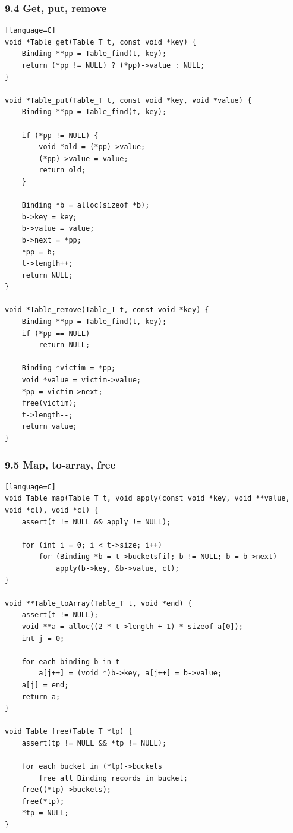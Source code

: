 \documentclass[11pt]{article}
\begin{document}
\subsubsection{9.4 Get, put, remove}\label{get-put-remove}

\begin{verbatim}[language=C]
void *Table_get(Table_T t, const void *key) {
    Binding **pp = Table_find(t, key);
    return (*pp != NULL) ? (*pp)->value : NULL;
}

void *Table_put(Table_T t, const void *key, void *value) {
    Binding **pp = Table_find(t, key);

    if (*pp != NULL) {
        void *old = (*pp)->value;
        (*pp)->value = value;
        return old;
    }

    Binding *b = alloc(sizeof *b);
    b->key = key;
    b->value = value;
    b->next = *pp;
    *pp = b;
    t->length++;
    return NULL;
}

void *Table_remove(Table_T t, const void *key) {
    Binding **pp = Table_find(t, key);
    if (*pp == NULL)
        return NULL;

    Binding *victim = *pp;
    void *value = victim->value;
    *pp = victim->next;
    free(victim);
    t->length--;
    return value;
}
\end{verbatim}

\subsubsection{9.5 Map, to-array, free}\label{map-to-array-free}

\begin{verbatim}[language=C]
void Table_map(Table_T t, void apply(const void *key, void **value, void *cl), void *cl) {
    assert(t != NULL && apply != NULL);

    for (int i = 0; i < t->size; i++)
        for (Binding *b = t->buckets[i]; b != NULL; b = b->next)
            apply(b->key, &b->value, cl);
}

void **Table_toArray(Table_T t, void *end) {
    assert(t != NULL);
    void **a = alloc((2 * t->length + 1) * sizeof a[0]);
    int j = 0;

    for each binding b in t
        a[j++] = (void *)b->key, a[j++] = b->value;
    a[j] = end;
    return a;
}

void Table_free(Table_T *tp) {
    assert(tp != NULL && *tp != NULL);

    for each bucket in (*tp)->buckets
        free all Binding records in bucket;
    free((*tp)->buckets);
    free(*tp);
    *tp = NULL;
}
\end{verbatim}
\end{document}
